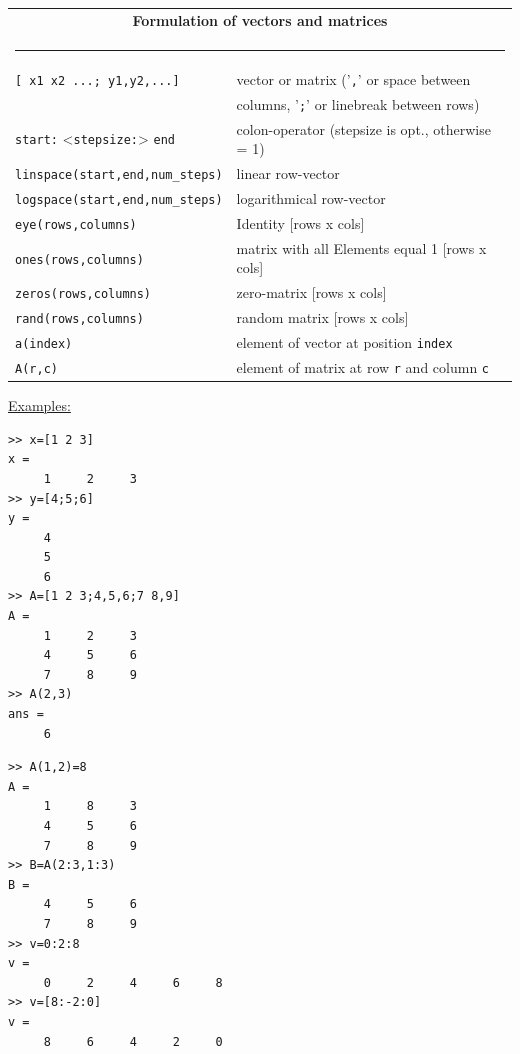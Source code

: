 \begin{tabular}{ll}
\multicolumn{2}{c}{\bf Formulation of vectors and matrices}\\
\multicolumn{2}{c}{\rule{0.97\textwidth}{0pt}}\\[-2ex]\hline
\verb/[ x1 x2 ...; y1,y2,...] / & vector or matrix ('\verb/,/' or space between\\
 &  columns, '\verb/;/' or linebreak between rows)\\
\verb/start:/ <\verb/stepsize:/> \verb/end/ & colon-operator (stepsize is opt., otherwise = 1)\\
\verb/linspace(start,end,num_steps)/ & linear row-vector\\
\verb/logspace(start,end,num_steps)/ & logarithmical row-vector\\
\verb/eye(rows,columns)/ & Identity [rows x cols]\\
\verb/ones(rows,columns)/ & matrix with all Elements equal 1 [rows x cols]\\
\verb/zeros(rows,columns)/ & zero-matrix [rows x cols]\\
\verb/rand(rows,columns)/ & random matrix [rows x cols]\\
\verb/a(index)/ & element of vector at position \verb/index/\\
\verb/A(r,c)/ & element of matrix at row \verb/r/ and column \verb/c/\\
\hline
\end{tabular}

\underline{Examples:}\\
\begin{minipage}[t]{0.5\textwidth}
\small\begin{verbatim}
>> x=[1 2 3]
x =
     1     2     3
>> y=[4;5;6]
y =
     4
     5
     6
>> A=[1 2 3;4,5,6;7 8,9]
A =
     1     2     3
     4     5     6
     7     8     9
>> A(2,3)
ans =
     6
\end{verbatim}
\end{minipage}
\hfill
\begin{minipage}[t]{0.5\textwidth}
\small\begin{verbatim}
>> A(1,2)=8
A =
     1     8     3
     4     5     6
     7     8     9
>> B=A(2:3,1:3)
B =
     4     5     6
     7     8     9
>> v=0:2:8
v =
     0     2     4     6     8
>> v=[8:-2:0]
v =
     8     6     4     2     0
\end{verbatim}
\end{minipage}

$\phantom{x}$

